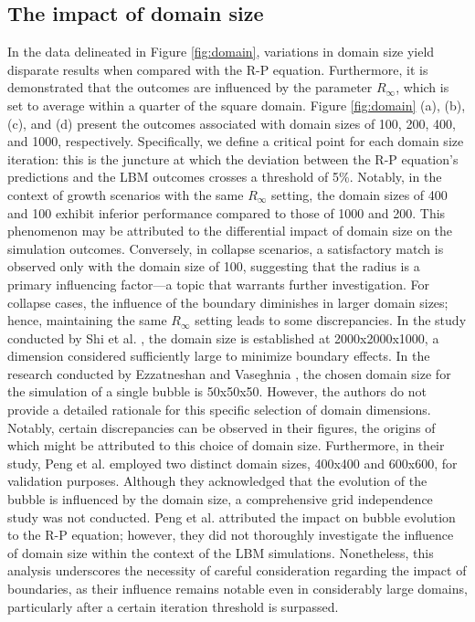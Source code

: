 \documentclass[review]{elsarticle}
\begin{document}
\subsection{The impact of domain size}
In the data delineated in Figure \ref{fig:domain}, variations in domain size yield disparate results when compared with the R-P equation. Furthermore, it is demonstrated that the outcomes are influenced by the parameter $R_{\infty}$, which is set to average within a quarter of the square domain. Figure \ref{fig:domain} (a), (b), (c), and (d) present the outcomes associated with domain sizes of 100, 200, 400, and 1000, respectively. Specifically, we define a critical point for each domain size iteration: this is the juncture at which the deviation between the R-P equation's predictions and the LBM outcomes crosses a threshold of 5\%. Notably, in the context of growth scenarios with the same $R_{\infty}$ setting, the domain sizes of 400 and 100 exhibit inferior performance compared to those of 1000 and 200. This phenomenon may be attributed to the differential impact of domain size on the simulation outcomes. Conversely, in collapse scenarios, a satisfactory match is observed only with the domain size of 100, suggesting that the radius is a primary influencing factor—a topic that warrants further investigation. For collapse cases, the influence of the boundary diminishes in larger domain sizes; hence, maintaining the same $R_{\infty}$ setting leads to some discrepancies. In the study conducted by Shi et al. \cite{shi2020numerical}, the domain size is established at 2000x2000x1000, a dimension considered sufficiently large to minimize boundary effects. In the research conducted by Ezzatneshan and Vaseghnia \cite{ezzatneshan2020simulation}, the chosen domain size for the simulation of a single bubble is 50x50x50. However, the authors do not provide a detailed rationale for this specific selection of domain dimensions. Notably, certain discrepancies can be observed in their figures, the origins of which might be attributed to this choice of domain size. Furthermore, in their study, Peng et al. \cite{peng2019simulation} employed two distinct domain sizes, 400x400 and 600x600, for validation purposes. Although they acknowledged that the evolution of the bubble is influenced by the domain size, a comprehensive grid independence study was not conducted. Peng et al. attributed the impact on bubble evolution to the R-P equation; however, they did not thoroughly investigate the influence of domain size within the context of the LBM simulations. Nonetheless, this analysis underscores the necessity of careful consideration regarding the impact of boundaries, as their influence remains notable even in considerably large domains, particularly after a certain iteration threshold is surpassed.
\end{document}
